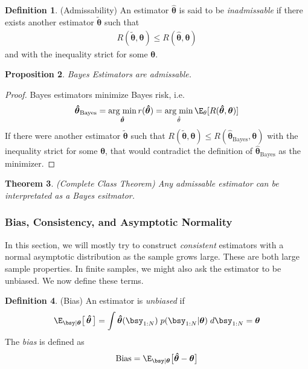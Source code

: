 \documentclass[12pt]{article}
\theoremstyle{plain}
\newtheorem{thm}{Theorem}[section]
\newtheorem{prop}[thm]{Proposition}
\theoremstyle{definition}
\newtheorem{defn}[thm]{Definition}
\theoremstyle{remark}
\newcommand{\bstheta}{\boldsymbol{\theta}}
\newcommand{\bshattheta}{\boldsymbol{\hat{\theta}}}
\newcommand{\bstildetheta}{\boldsymbol{\tilde{\theta}}}
\DeclareMathOperator*{\argmin}{arg\;min}
\begin{document}
\begin{defn}(Admissability)
An estimator $\bshattheta$ is said to be \emph{inadmissable} if there
exists another estimator $\bstildetheta$ such that
\begin{align*}
  R(\bstildetheta,\bstheta)
  \leq
  R(\bshattheta,\bstheta)
\end{align*}
and with the inequality strict for some $\bstheta$.
\end{defn}

\begin{prop}
Bayes Estimators are admissable.
\end{prop}
\begin{proof}
Bayes estimators minimize Bayes risk, i.e.
\begin{align*}
  \bshattheta_\text{Bayes}
  = \argmin_{\bshattheta} r(\bshattheta)
  = \argmin_{\hat{\theta}}\E_\theta[R(\bshattheta,\bstheta)]
\end{align*}
If there were another estimator $\bstildetheta$ such that
$R(\bstildetheta,\bstheta)\leq R(\bshattheta_\text{Bayes},\bstheta)$
with the inequality strict for some $\bstheta$, that would contradict
the definition of $\bshattheta_\text{Bayes}$ as the minimizer.
\end{proof}

\begin{thm}\emph{(Complete Class Theorem)}
Any admissable estimator can be interpretated as a Bayes esitmator.
\end{thm}


\clearpage
\subsubsection{Bias, Consistency, and Asymptotic Normality}

In this section, we will mostly try to construct \emph{consistent}
estimators with a normal asymptotic distribution as the sample grows
large. These are both large sample properties. In finite samples, we
might also ask the estimator to be unbiased. We now define these terms.

\begin{defn}(Bias)
An estimator is \emph{unbiased} if
\begin{align*}
  \E_{\bsy|\bstheta}\big[\,\bshattheta\,\big]
  =
  \int
    \bshattheta(\bsy_{1:N}) \;
    p(\bsy_{1:N}|\bstheta) \; d\bsy_{1:N} = \bstheta
\end{align*}
The \emph{bias} is defined as
\begin{align*}
  \text{Bias} = \E_{\bsy|\bstheta}\big[\bshattheta-\bstheta\big]
\end{align*}
\end{defn}
\end{document}
